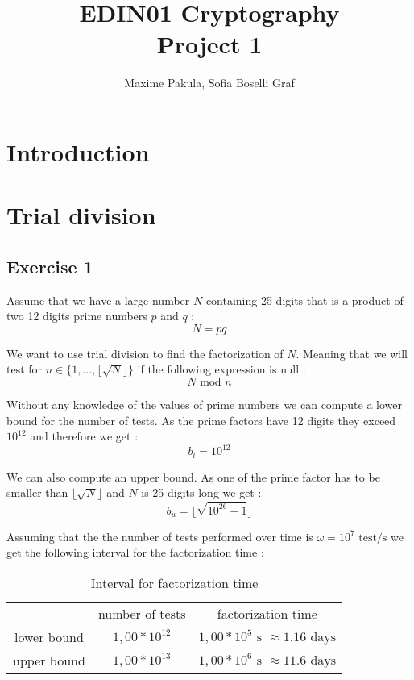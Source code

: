 \documentclass{article}
\title{EDIN01 Cryptography \\ Project 1}
\author{Maxime Pakula, Sofia Boselli Graf}
\begin{document}
\maketitle

\tableofcontents

\newpage

\section{Introduction}

\section{Trial division}

\subsection{Exercise 1}

Assume that we have a large number $N$ containing 25 digits that is a product of two 12 digits prime numbers $p$ and $q$ :
$$N = pq$$

We want to use trial division to find the factorization of $N$. Meaning that we will test for $n \in \{1,\dotsc,\lfloor\sqrt{N}\rfloor\}$ if the following expression is null :
$$N \text{ mod } n$$

Without any knowledge of the values of prime numbers we can compute a lower bound for the number of tests. As the prime factors have 12 digits they exceed $10^{12}$ and therefore we get :
$$b_l = 10^{12}$$

We can also compute an upper bound. As one of the prime factor has to be smaller than $\lfloor\sqrt{N}\rfloor$ and $N$ is 25 digits long we get :
$$b_u = \lfloor\sqrt{10^{26}-1}\rfloor$$

Assuming that the the number of tests performed over time is $\omega = 10^7 \text{ test/s}$ we get the following interval for the factorization time :

\begin{table}[H]
    \centering
    \begin{tabular}{c|c|c}
         & number of tests & factorization time \\
        lower bound & $1,00*10^{12}$ & $1,00*10^{5} \text{ s } \approx 1.16 \text{ days}$ \\
        upper bound & $ 1,00*10^{13}$ & $1,00*10^{6} \text{ s } \approx 11.6 \text{ days}$
    \end{tabular}
    \caption{Interval for factorization time}
\end{table}
\end{document}
